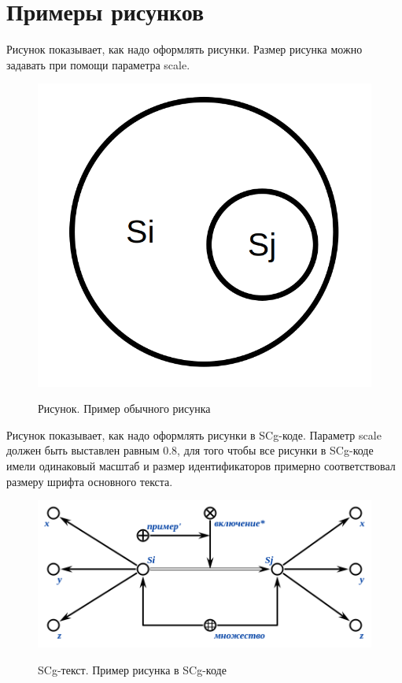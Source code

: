 \section*{Примеры рисунков}

Рисунок \textit{} показывает, как надо оформлять рисунки. Размер рисунка можно задавать при помощи параметра scale.

\begin{figure}[H]
	\caption{Рисунок. Пример обычного рисунка}
	\includegraphics[scale=0.5]{images/fig_example.png}
	\label{fig:example}
\end{figure}

Рисунок \textit{} показывает, как надо оформлять рисунки в SCg-коде. Параметр scale должен быть выставлен равным 0.8, для того чтобы все рисунки в SCg-коде имели одинаковый масштаб и размер идентификаторов примерно соответствовал размеру шрифта основного текста.  

\begin{figure}[H]
	\caption{SCg-текст. Пример рисунка в SCg-коде}
	\includegraphics[scale=0.8]{images/fig_example_scg.png}
	\label{fig:example_scg}
\end{figure}
